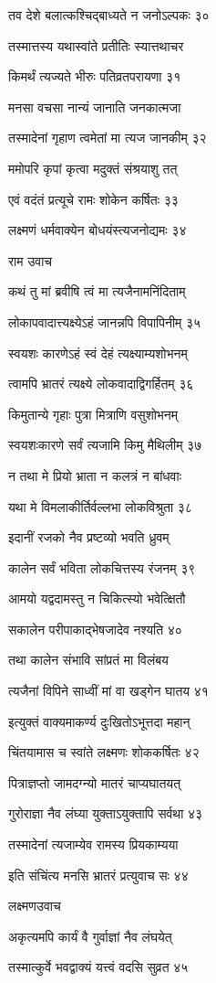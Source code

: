 तव देशे बलात्कश्चिद्बाध्यते न जनोऽल्पकः ३०

तस्मात्तस्य यथास्वांते प्रतीतिः स्यात्तथाचर

किमर्थं त्यज्यते भीरुः पतिव्रतपरायणा ३१

मनसा वचसा नान्यं जानाति जनकात्मजा

तस्मादेनां गृहाण त्वमेतां मा त्यज जानकीम् ३२

ममोपरि कृपां कृत्वा मदुक्तं संश्रयाशु तत्

एवं वदंतं प्रत्यूचे रामः शोकेन कर्षितः ३३

लक्ष्मणं धर्मवाक्येन बोधयंस्त्यजनोद्यमः ३४

राम उवाच

कथं तु मां ब्रवीषि त्वं मा त्यजैनामनिंदिताम्

लोकापवादात्त्यक्ष्येऽहं जानन्नपि विपापिनीम् ३५

स्वयशः कारणेऽहं स्वं देहं त्यक्ष्याम्यशोभनम्

त्वामपि भ्रातरं त्यक्ष्ये लोकवादाद्विगर्हितम् ३६

किमुतान्ये गृहाः पुत्रा मित्राणि वसुशोभनम्

स्वयशःकारणे सर्वं त्यजामि किमु मैथिलीम् ३७

न तथा मे प्रियो भ्राता न कलत्रं न बांधवाः

यथा मे विमलाकीर्तिर्वल्लभा लोकविश्रुता ३८

इदानीं रजको नैव प्रष्टव्यो भवति ध्रुवम्

कालेन सर्वं भविता लोकचित्तस्य रंजनम् ३९

आमयो यद्वदामस्तु न चिकित्स्यो भवेत्क्षितौ

सकालेन परीपाकाद्भेषजादेव नश्यति ४०

तथा कालेन संभावि सांप्रतं मा विलंबय

त्यजैनां विपिने साध्वीं मां वा खड्गेन घातय ४१

इत्युक्तं वाक्यमाकर्ण्य दुःखितोऽभूत्तदा महान्

चिंतयामास च स्वांते लक्ष्मणः शोककर्षितः ४२

पित्राज्ञप्तो जामदग्न्यो मातरं चाप्यघातयत्

गुरोराज्ञा नैव लंघ्या युक्ताऽयुक्तापि सर्वथा ४३

तस्मादेनां त्यजाम्येव रामस्य प्रियकाम्यया

इति संचिंत्य मनसि भ्रातरं प्रत्युवाच सः ४४

लक्ष्मणउवाच

अकृत्यमपि कार्यं वै गुर्वाज्ञां नैव लंघयेत्

तस्मात्कुर्वे भवद्वाक्यं यत्त्वं वदसि सुव्रत ४५

